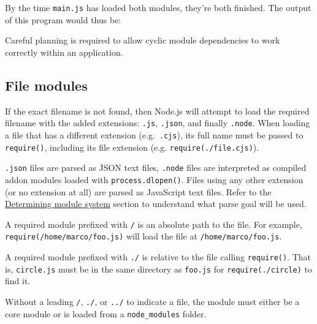 By the time \texttt{main.js} has loaded both modules, they're both
finished. The output of this program would thus be:

\begin{Shaded}
\begin{Highlighting}[]
\end{Highlighting}
\end{Shaded}

Careful planning is required to allow cyclic module dependencies to work
correctly within an application.

\subsection{File modules}\label{file-modules}

If the exact filename is not found, then Node.js will attempt to load
the required filename with the added extensions: \texttt{.js},
\texttt{.json}, and finally \texttt{.node}. When loading a file that has
a different extension (e.g.~\texttt{.cjs}), its full name must be passed
to \texttt{require()}, including its file extension (e.g.
\texttt{require(\textquotesingle{}./file.cjs\textquotesingle{})}).

\texttt{.json} files are parsed as JSON text files, \texttt{.node} files
are interpreted as compiled addon modules loaded with
\texttt{process.dlopen()}. Files using any other extension (or no
extension at all) are parsed as JavaScript text files. Refer to the
\href{packages.md\#determining-module-system}{Determining module system}
section to understand what parse goal will be used.

A required module prefixed with
\texttt{\textquotesingle{}/\textquotesingle{}} is an absolute path to
the file. For example,
\texttt{require(\textquotesingle{}/home/marco/foo.js\textquotesingle{})}
will load the file at \texttt{/home/marco/foo.js}.

A required module prefixed with
\texttt{\textquotesingle{}./\textquotesingle{}} is relative to the file
calling \texttt{require()}. That is, \texttt{circle.js} must be in the
same directory as \texttt{foo.js} for
\texttt{require(\textquotesingle{}./circle\textquotesingle{})} to find
it.

Without a leading \texttt{\textquotesingle{}/\textquotesingle{}},
\texttt{\textquotesingle{}./\textquotesingle{}}, or
\texttt{\textquotesingle{}../\textquotesingle{}} to indicate a file, the
module must either be a core module or is loaded from a
\texttt{node\_modules} folder.

